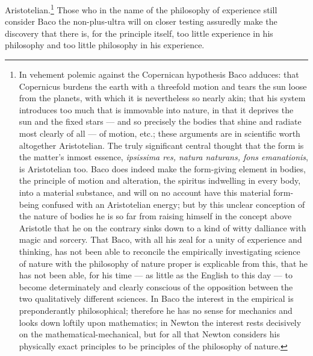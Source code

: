 \documentclass[12pt,a4paper]{book}
\begin{document}
Aristotelian.\footnote{%
In vehement polemic against the Copernican hypothesis Baco adduces: that Copernicus burdens the earth with a
threefold motion and tears the sun loose from the planets, with which it is nevertheless so nearly akin;
that his system introduces too much that is immovable into nature, in that it deprives the sun and the fixed
stars --- and so precisely the bodies that shine and radiate most clearly of all --- of motion, etc.; these
arguments are in scientific worth altogether Aristotelian. The truly significant central thought that the
form is the matter's inmost essence, \textit{ipsissima res, natura naturans, fons emanationis}, is
Aristotelian too. Baco does indeed make the form-giving element in bodies, the principle of motion and
alteration, the spiritus indwelling in every body, into a material substance, and will on no account have
this material form-being confused with an Aristotelian energy; but by this unclear conception of the nature
of bodies he is so far from raising himself in the concept above Aristotle that he on the contrary sinks down
to a kind of witty dalliance with magic and sorcery. That Baco, with all his zeal for a unity of experience
and thinking, has not been able to reconcile the empirically investigating science of nature with the
philosophy of nature proper is explicable from this, that he has not been able, for his time --- as little
as the English to this day --- to become determinately and clearly conscious of the opposition between the
two qualitatively different sciences. In Baco the interest in the empirical is preponderantly philosophical;
therefore he has no sense for mechanics and looks down loftily upon mathematics; in Newton the interest rests
decisively on the mathematical-mechanical, but for all that Newton considers his physically exact principles
to be principles of the philosophy of nature.} Those who in the name of the philosophy of experience
still consider Baco the non-plus-ultra will on closer testing assuredly make the discovery that there is, for
the principle itself, too little experience in his philosophy and too little philosophy in his experience.
\end{document}
